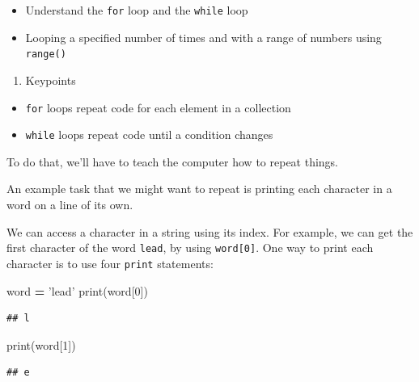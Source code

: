 \documentclass[]{book}
\newenvironment{Shaded}{\begin{snugshade}}{\end{snugshade}}
\newcommand{\BuiltInTok}[1]{#1}
\newcommand{\DecValTok}[1]{\textcolor[rgb]{0.00,0.00,0.81}{#1}}
\newcommand{\NormalTok}[1]{#1}
\newcommand{\OperatorTok}[1]{\textcolor[rgb]{0.81,0.36,0.00}{\textbf{#1}}}
\newcommand{\StringTok}[1]{\textcolor[rgb]{0.31,0.60,0.02}{#1}}
\providecommand{\tightlist}{%
  \setlength{\itemsep}{0pt}\setlength{\parskip}{0pt}}
\theoremstyle{definition}
\theoremstyle{definition}
\theoremstyle{definition}
\theoremstyle{remark}
\begin{document}
\begin{itemize}
\tightlist
\item
  Understand the \texttt{for} loop and the \texttt{while} loop
\item
  Looping a specified number of times and with a range of numbers using
  \texttt{range()}
\end{itemize}

\begin{enumerate}
\def\labelenumi{\arabic{enumi}.}
\setcounter{enumi}{2}
\tightlist
\item
  Keypoints
\end{enumerate}

\begin{itemize}
\tightlist
\item
  \texttt{for} loops repeat code for each element in a collection
\item
  \texttt{while} loops repeat code until a condition changes
\end{itemize}

To do that, we'll have to teach the computer how to repeat things.

An example task that we might want to repeat is printing each character
in a word on a line of its own.

We can access a character in a string using its index. For example, we
can get the first character of the word
\texttt{\textquotesingle{}lead\textquotesingle{}}, by using
\texttt{word{[}0{]}}. One way to print each character is to use four
\texttt{print} statements:

\begin{Shaded}
\begin{Highlighting}[]
\NormalTok{word }\OperatorTok{=} \StringTok{'lead'}
\BuiltInTok{print}\NormalTok{(word[}\DecValTok{0}\NormalTok{])}
\end{Highlighting}
\end{Shaded}

\begin{verbatim}
## l
\end{verbatim}

\begin{Shaded}
\begin{Highlighting}[]
\BuiltInTok{print}\NormalTok{(word[}\DecValTok{1}\NormalTok{])}
\end{Highlighting}
\end{Shaded}

\begin{verbatim}
## e
\end{verbatim}
\end{document}
